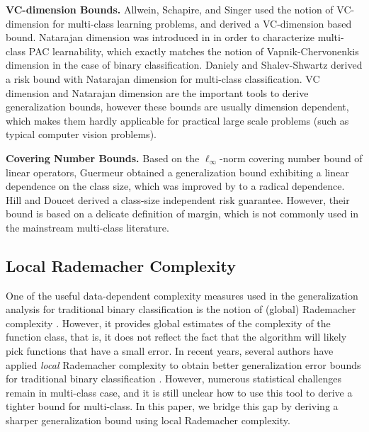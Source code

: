 \documentclass{article}
\begin{document}
    \textbf{VC-dimension Bounds.}
    Allwein, Schapire, and Singer   used the notion of VC-dimension
    for multi-class learning problems,
    and derived a VC-dimension based bound.
    Natarajan dimension was introduced in \cite{Natarajan1989} in
    order to characterize multi-class PAC learnability,
    which exactly matches the notion of Vapnik-Chervonenkis
    dimension in the case of binary classification.
    Daniely and Shalev-Shwartz  derived a risk bound with Natarajan dimension for multi-class classification.
    VC dimension and Natarajan dimension are the important tools to derive generalization bounds,
    however these bounds are usually dimension
    dependent, which makes them hardly applicable for practical large
    scale problems (such as typical computer vision problems).

   \textbf{Covering Number  Bounds.}
    Based on the $\ell_\infty$-norm covering number bound of
    linear operators, Guermeur  obtained
    a generalization bound exhibiting a linear dependence on the class size,
    which was improved by \cite{zhang2004statistical} to a radical dependence.
    Hill and Doucet  derived a class-size independent risk guarantee.
    However, their bound is based on a delicate definition of margin,
    which is not commonly used in the mainstream multi-class literature.
\subsection{Local Rademacher Complexity}
One of the useful data-dependent complexity measures used in the generalization analysis
for  traditional  binary classification
is the notion of (global) Rademacher complexity \cite{bartlett2003rademacher}.
However,
it provides global estimates of the complexity of the function class,
that is, it does not reflect
the fact that the algorithm will likely pick functions that have a small error.
In recent years,
several authors have applied
 \emph{local} Rademacher complexity to obtain  better generalization error bounds
for traditional binary classification \cite{Bartlett2005lrc,Koltchinskii2006lrcoiirm}.
However,
numerous statistical challenges remain in multi-class case, and it is still unclear how to use
this tool to derive a tighter bound for multi-class.
In this paper,
we bridge this gap by deriving a sharper generalization bound using local Rademacher complexity.
\end{document}
